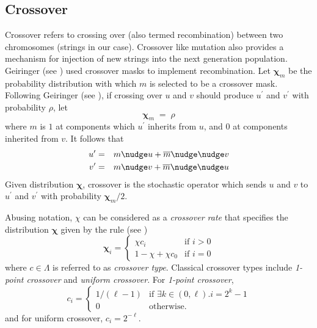 \subsection{Crossover}
Crossover refers to crossing over (also termed recombination) between two chromosomes (strings in our case). 
Crossover like mutation also provides a mechanism for injection of new strings into the next generation population. 
Geiringer (see \cite{Geiringer1944}) used crossover masks to implement recombination. Let $\bm{\chi}_m$ be the probability distribution with which $m$ is 
selected to be a crossover mask. Following Geiringer (see \cite{Geiringer1944}), if crossing over $u$ and $v$ 
should produce $u^\prime$ and $v^\prime$ with probability $\rho$, let
\[
\bm{\chi}_m \; = \; \rho
\]
where $m$ is $1$ at components which $u^\prime$ inherits from $u$, and
$0$ at components inherited from $v$.  It follows that\\[-0.3in]
\begin{eqnarray*}
u^\prime & = & m \nudge u + \overline{m} \nudge\nudge v \\
v^\prime & = & m \nudge v + \overline{m} \nudge\nudge u
\end{eqnarray*}
Given distribution $\bm{\chi}$, crossover is the stochastic operator which
sends $u$ and $v$ to $u^\prime$ and $v^\prime$ with probability $\bm{\chi}_m/2$.

Abusing notation, $\chi$ can be considered as a {\em crossover rate} that specifies 
the distribution $\bm{\chi}$ given by the rule (see \cite{VoseWright1998})
\[
  \bm{\chi}_i =\begin{cases}
    \chi c_i & \text{if $i>0$}\\
    1 - \chi + \chi  c_0 & \text{if $i = 0$}
  \end{cases}
\]
where $c \in \Lambda$ is referred to as {\em crossover type}. Classical crossover types 
include {\em 1-point crossover} and {\em uniform crossover}. For {\em 1-point crossover},
\[
  c_i =\begin{cases}
    1/(\ell - 1) & \text{if $\exists k \in (0, \ell).i = 2^k - 1$}\\
    0 & \text{otherwise}.
  \end{cases}
\]
and for uniform crossover, $c_i = 2^{-\ell}$.

